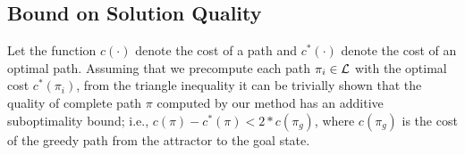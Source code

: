\documentclass[a4paper]{report}
\begin{document}

\subsection{Bound on Solution Quality}
\label{subsec:quality}
Let the function $c(\cdot)$ denote the cost of a path and $c^*(\cdot)$ denote the cost of an optimal path. Assuming that we precompute each path $\pi_i \in \mathcal{L}$ with the optimal cost $c^*(\pi_i)$, from the triangle inequality it can be trivially shown that the quality of complete path $\pi$ computed by our method has an additive suboptimality bound; i.e.,
 $c(\pi) - c^*(\pi) < 2 * c(\pi_g)$,
where $c(\pi_g)$ is the cost of the greedy path from the attractor to the goal state.
\end{document}
